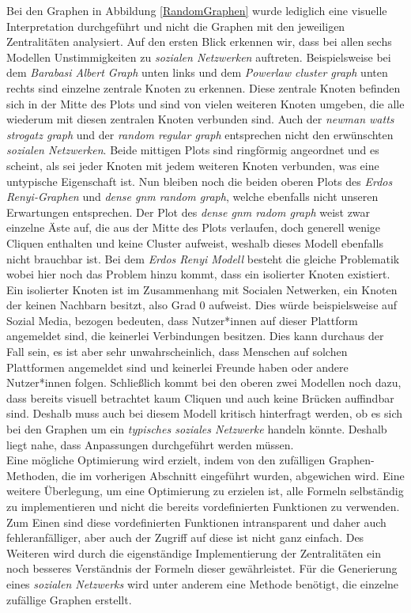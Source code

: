 Bei den Graphen in Abbildung \ref{RandomGraphen} wurde lediglich eine visuelle Interpretation durchgeführt und nicht die Graphen mit den jeweiligen Zentralitäten analysiert. Auf den ersten Blick erkennen wir, dass bei allen sechs Modellen Unstimmigkeiten zu \textit{sozialen Netzwerken} auftreten. Beispielsweise bei dem \textit{Barabasi Albert Graph} unten links und dem \textit{Powerlaw cluster graph} unten rechts sind einzelne zentrale Knoten zu erkennen. Diese zentrale Knoten befinden sich in der Mitte des Plots und sind von vielen weiteren Knoten umgeben, die alle wiederum mit diesen zentralen Knoten verbunden sind. Auch der \textit{newman watts strogatz graph} und der \textit{random regular graph} entsprechen nicht den erwünschten \textit{sozialen Netzwerken}. Beide mittigen Plots sind ringförmig angeordnet und es scheint, als sei jeder Knoten mit jedem weiteren Knoten verbunden, was eine untypische Eigenschaft ist. Nun bleiben noch die beiden oberen Plots des \textit{Erdos Renyi-Graphen} und \textit{dense gnm random graph}, welche ebenfalls nicht unseren Erwartungen entsprechen. Der Plot des \textit{dense gnm radom graph} weist zwar einzelne Äste auf, die aus der Mitte des Plots verlaufen, doch generell wenige Cliquen enthalten und keine Cluster aufweist, weshalb dieses Modell ebenfalls nicht brauchbar ist. Bei dem \textit{Erdos Renyi Modell} besteht die gleiche Problematik wobei hier noch das Problem hinzu kommt, dass ein isolierter Knoten existiert. Ein isolierter Knoten ist im Zusammenhang mit Socialen Netwerken, ein Knoten der keinen Nachbarn besitzt, also Grad $0$ aufweist.
Dies würde beispielsweise auf Sozial Media, bezogen bedeuten, dass Nutzer*innen auf dieser Plattform angemeldet sind, die keinerlei Verbindungen besitzen. Dies kann durchaus der Fall sein, es ist aber sehr unwahrscheinlich, dass Menschen auf solchen Plattformen angemeldet sind und keinerlei Freunde haben oder andere Nutzer*innen folgen.
\newpage
Schließlich kommt bei den oberen zwei Modellen noch dazu, dass bereits visuell betrachtet kaum Cliquen und auch keine Brücken auffindbar sind. Deshalb muss auch bei diesem Modell kritisch hinterfragt werden, ob es sich bei den Graphen um ein \textit{typisches soziales Netzwerke} handeln könnte. Deshalb liegt nahe, dass Anpassungen durchgeführt werden müssen.\\


Eine mögliche Optimierung wird erzielt, indem von den zufälligen Graphen-Methoden, die im vorherigen Abschnitt eingeführt wurden, abgewichen wird. Eine weitere Überlegung, um eine Optimierung zu erzielen ist, alle Formeln selbständig zu implementieren und nicht die bereits vordefinierten Funktionen zu verwenden. Zum Einen sind diese vordefinierten Funktionen intransparent und daher auch fehleranfälliger, aber auch der Zugriff auf diese ist nicht ganz einfach. Des Weiteren wird durch die eigenständige Implementierung der Zentralitäten ein noch besseres Verständnis der Formeln dieser gewährleistet.
Für die Generierung eines \textit{sozialen Netzwerks} wird unter anderem eine Methode benötigt, die einzelne zufällige Graphen erstellt. 

